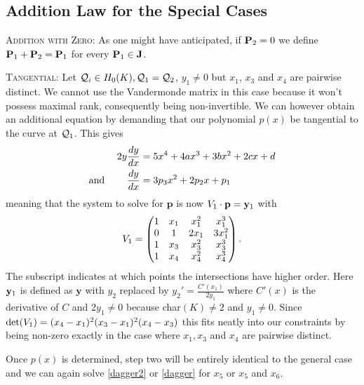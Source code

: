 \subsection{Addition Law for the Special Cases}

\setcounter{case}{-1}

\begin{case}
  {\scshape Addition with Zero:} As one might have anticipated, if $\P_2 = 0$ we define $\P_1 + \P_2 = \P_1$ for every $\P_1 \in \J$.
\end{case}

\setcounter{case}{1}
\begin{case}
	{\scshape Tangential:} Let $\q_i\in \enk, \q_1 = \q_2$, $y_1 \neq 0$ but $x_1$, $x_3$ and $x_4$ are pairwise distinct. We cannot use the Vandermonde matrix in this case because it won't possess maximal rank, consequently being non-invertible. We can however obtain an additional equation by demanding that our polynomial $p(x)$ be tangential to the curve at $\q_1$. This gives
	\begin{align*}
	  2 y \frac{dy}{dx} &= 5  x^4 + 4 a x^3 + 3 b x^2 + 2 c x + d \\
	  \text{and\hspace{8mm}} \frac{dy}{dx} &= 3 p_3 x^2 + 2 p_2 x + p_1
	\end{align*}
	meaning that the system to solve for $\mathbf{p}$ is now $\Vdoub \cdot \mathbf{p} = \ydoub$ with
	\begin{align*}\Vdoub=
		\begin{pmatrix}
			1 & x_1 & x_1^2 & x_1^3\\
			0 & 1 & 2 x_1 & 3 x_1^2\\
			1 & x_3 & x_3^2 & x_3^3\\
			1 & x_4 & x_4^2 & x_4^3\\
		\end{pmatrix}.
	\end{align*}
	The subscript indicates at which points the intersections have higher order.
	Here $\ydoub$ is defined as $\mathbf{y}$ with $y_2$ replaced by $y_2'=\frac{C'(x_1)}{2 y_1}$ where $C'(x)$ is the derivative of $C$ and $2y_1 \neq 0$ because char$(K) \neq 2$ and $y_1\neq 0$. Since $\det(\Vdoub) = (x_4-x_1)^2(x_3-x_1)^2(x_4-x_3)$ this fits neatly into our constraints by being non-zero exactly in the case where $x_1, x_3$ and $x_4$ are pairwise distinct.

	Once $p(x)$ is determined, step two will be entirely identical to the general case and we can again solve \eqref{dagger2} or \eqref{dagger} for $x_5$ or $x_5$ and $x_6$.

\end{case}

